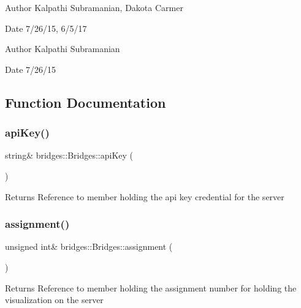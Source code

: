 \begin{DoxyAuthor}{Author}
Kalpathi Subramanian, Dakota Carmer 
\end{DoxyAuthor}
\begin{DoxyDate}{Date}
7/26/15, 6/5/17
\end{DoxyDate}
\begin{DoxyAuthor}{Author}
Kalpathi Subramanian 
\end{DoxyAuthor}
\begin{DoxyDate}{Date}
7/26/15 
\end{DoxyDate}


\subsection{Function Documentation}
\mbox{\label{namespacebridges_1_1_bridges_a4ec319d8c731624bd1aa0efa2427044e}} 
\subsubsection{\texorpdfstring{api\+Key()}{apiKey()}}
{\footnotesize\ttfamily string\& bridges\+::\+Bridges\+::api\+Key (\begin{DoxyParamCaption}{ }\end{DoxyParamCaption})}

\begin{DoxyReturn}{Returns}
Reference to member holding the api key credential for the server 
\end{DoxyReturn}
\mbox{\label{namespacebridges_1_1_bridges_a97d6cfdc40ecead5d802ac2054933038}} 
\subsubsection{\texorpdfstring{assignment()}{assignment()}}
{\footnotesize\ttfamily unsigned int\& bridges\+::\+Bridges\+::assignment (\begin{DoxyParamCaption}{ }\end{DoxyParamCaption})}

\begin{DoxyReturn}{Returns}
Reference to member holding the assignment number for holding the visualization on the server 
\end{DoxyReturn}
\mbox{\label{namespacebridges_1_1_bridges_a76925874a2d859dd770b86ab89105ddd}} 
